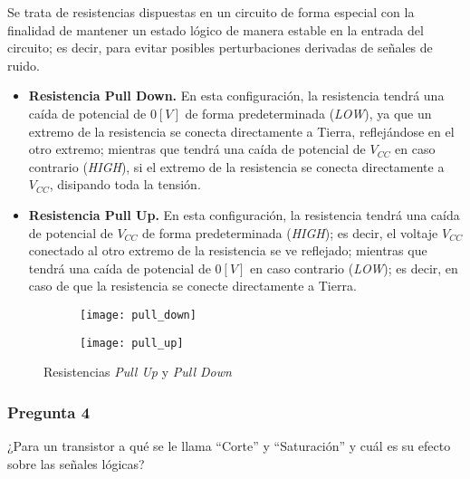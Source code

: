 \documentclass[../procedimientos.tex]{subfiles}
\begin{document}
Se trata de resistencias dispuestas en un circuito de forma especial con la 
finalidad de mantener un estado lógico de manera estable en la entrada del 
circuito; es decir, para evitar posibles perturbaciones derivadas de señales 
de ruido.
\begin{itemize}
  \item \textbf{Resistencia Pull Down.} En esta configuración, la resistencia 
    tendrá una caída de potencial de $0 [V]$ de forma predeterminada 
    (\textit{LOW}), ya que un extremo de la resistencia se conecta 
    directamente a Tierra, reflejándose en el otro extremo; mientras que 
    tendrá una caída de potencial de $V_{CC}$ en caso contrario 
    (\textit{HIGH}), si el extremo de la resistencia se conecta directamente a 
    $V_{CC}$, disipando toda la tensión.
  \item \textbf{Resistencia Pull Up.} En esta configuración, la resistencia  
    tendrá una caída de potencial de $V_{CC}$ de forma predeterminada 
    (\textit{HIGH}); es decir, el voltaje $V_{CC}$ conectado al otro extremo 
    de la resistencia se ve reflejado; mientras que tendrá una caída de 
    potencial de $0[V]$ en caso contrario (\textit{LOW}); es decir, en caso de 
    que la resistencia se conecte directamente a Tierra.
\end{itemize}

\begin{figure}[H]
  \centering
  \begin{subfigure}[b]{0.45\textwidth}
    \centering
    \texttt{[image: pull\_down]}
  \end{subfigure}
  \hfill
  \begin{subfigure}[b]{0.45\textwidth}
    \centering
    \texttt{[image: pull\_up]}
  \end{subfigure}
  \caption{Resistencias \textit{Pull Up} y \textit{Pull Down}}
\end{figure}

\subsubsection*{Pregunta 4}
\begin{em}
  ¿Para un transistor a qué se le llama ``Corte'' y ``Saturación'' y cuál es su 
  efecto sobre las señales lógicas?
\end{em}
\end{document}
